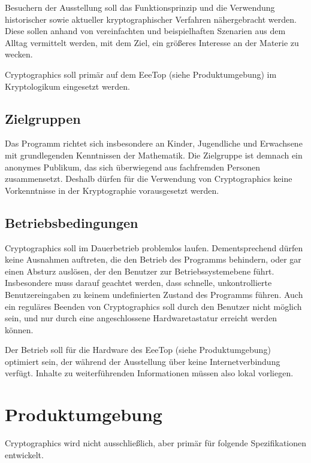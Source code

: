 \documentclass{article}
\begin{document}
Besuchern der Ausstellung soll das Funktionsprinzip und die Verwendung historischer  sowie aktueller kryptographischer Verfahren nähergebracht werden. Diese sollen anhand von vereinfachten und beispielhaften Szenarien aus dem Alltag vermittelt werden, mit dem Ziel, ein größeres Interesse an der Materie zu wecken.

\gls{Cryptographics} soll primär auf dem \gls{EeeTop} (siehe Produktumgebung) im \gls{Kryptologikum} eingesetzt werden.

\subsection{Zielgruppen}

Das Programm richtet sich insbesondere an Kinder, Jugendliche und Erwachsene mit grundlegenden Kenntnissen der Mathematik. Die Zielgruppe ist demnach ein anonymes Publikum, das sich überwiegend aus fachfremden Personen zusammensetzt. Deshalb dürfen für die Verwendung von \gls{Cryptographics} keine Vorkenntnisse in der Kryptographie vorausgesetzt werden.

\subsection{Betriebsbedingungen}

\gls{Cryptographics} soll im Dauerbetrieb problemlos laufen. Dementsprechend dürfen keine Ausnahmen auftreten, die den Betrieb des Programms behindern, oder gar einen Absturz auslösen, der den Benutzer zur Betriebssystemebene führt. Insbesondere muss darauf geachtet werden, dass schnelle, unkontrollierte Benutzereingaben zu keinem undefinierten Zustand des Programms führen. Auch ein reguläres Beenden von \gls{Cryptographics} soll durch den Benutzer nicht möglich sein, und nur durch eine angeschlossene Hardwaretastatur erreicht werden können.

Der Betrieb soll für die Hardware des \gls{EeeTop} (siehe Produktumgebung) optimiert sein, der während der Ausstellung über keine Internetverbindung verfügt. Inhalte zu weiterführenden Informationen müssen also lokal vorliegen.

\section{Produktumgebung}

\gls{Cryptographics} wird nicht ausschließlich, aber primär für folgende Spezifikationen entwickelt.
\end{document}
